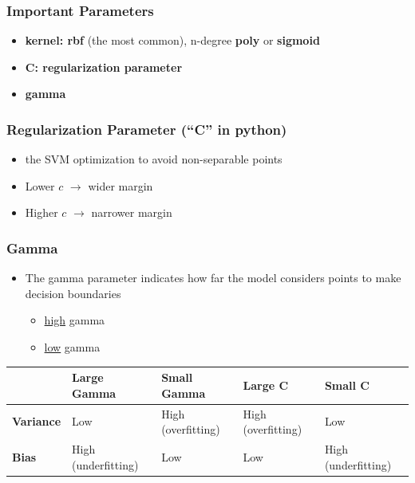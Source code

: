\documentclass{article}
\begin{document}
\subsubsection*{Important Parameters}
\begin{itemize}
    \item \textbf{kernel: rbf} (the most common), n-degree \textbf{poly} or \textbf{sigmoid}
    \item \textbf{C: regularization parameter}
    \item \textbf{gamma}
\end{itemize}
\subsubsection*{Regularization Parameter (``C'' in python)}
\begin{itemize}
    \item the SVM optimization to avoid non-separable points
    \item Lower $c$ $\rightarrow$ wider margin
    \item Higher $c$ $\rightarrow$ narrower margin
\end{itemize}
\subsubsection*{Gamma}
\begin{itemize}
    \item The gamma parameter indicates how far the model considers points to make decision boundaries
    \begin{itemize}
        \item \underline{high} gamma
        \item \underline{low} gamma
    \end{itemize}
\end{itemize}
\begin{center}
    \begin{tabular}{|l|l|l|l|l|}
    \hline
                                              & \cellcolor[HTML]{C0C0C0}\textbf{Large Gamma} & \cellcolor[HTML]{C0C0C0}\textbf{Small Gamma} & \cellcolor[HTML]{C0C0C0}\textbf{Large C} & \cellcolor[HTML]{C0C0C0}\textbf{Small C} \\ \hline
    \cellcolor[HTML]{C0C0C0}\textbf{Variance} & Low                                          & High (overfitting)                           & High (overfitting)                       & Low                                      \\ \hline
    \cellcolor[HTML]{C0C0C0}\textbf{Bias}     & High (underfitting)                          & Low                                          & Low                                      & High (underfitting)                      \\ \hline
    \end{tabular}
\end{center}
\end{document}
